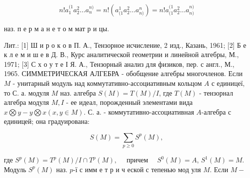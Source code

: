\documentclass[10pt]{article}
\begin{document}
\[

n ! a_{1}^{(1} a_{2}^{2} \ldots a_{n}^{n)}=n !\left(a_{(1}^{1} a_{2}^{2} \ldots a_{n)}^{n}\right)=n ! a_{(1}^{(1} a_{2}^{2} \ldots a_{n)}^{n)}

\]



наз. п е р м а н е т о м мат р и цы.



Лит.: [1] Ш и р о к о в П. А., Тензорное исчисление, 2 изд., Казань, 1961; [2] Б е к л е м и ш е в Д. В., Курс аналитической геометрии и линейной алгебры, М., 1971; [3] С х о у т е І Я. А., Тензорный анализ для физиков, пер. с англ., М., 1965. СИММЕТРИЧЕСКАЯ АЛГЕБРА - обобщение алгебры многочленов. Если $M$ - унитарный модуль над коммутативно-ассоциативным кольцом $A$ с единицеї, то С. а. модуля $M$ наз. алгебра $S(M)=T(M) / I$, где $T(M)$ - тензорнал алгебра модуля $M, I$ - ее идеал, порожденный элементами вида $x \bigotimes y-y \bigotimes x(x, y \in M)$. С. а. - коммутативно-ассоциативная $A$-алгебра с единицей; она градуирована:



\[

S(M)=\sum_{p \geqslant 0} S^{p}(M),

\]



где $S^{p}(M)=T^{p}(M) / I \cap T^{p}(M), \quad$ причем $\quad S^{0}(M)=A$, $S^{1}(M)=M$. Модуль $S^{p}(M)$ наз. $p$-ї с имм е т р и ч еской с тепенью мод уля $M$. Если $M-$
\end{document}
